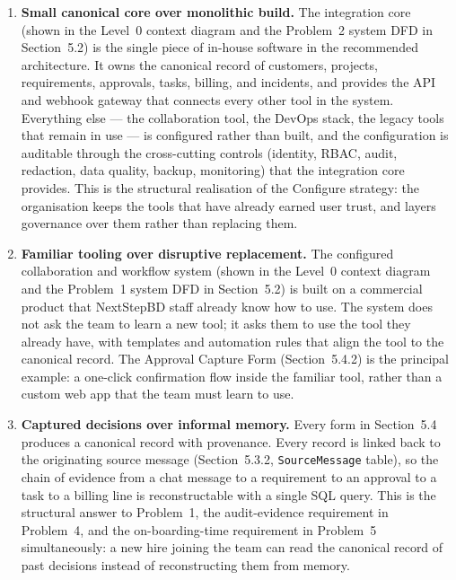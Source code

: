 \documentclass[12pt,a4paper]{report}
\begin{document}
\begin{enumerate}[leftmargin=1.6em]
    \item \textbf{Small canonical core over monolithic build.} The
          integration core (shown in the Level~0 context diagram and the
          Problem~2 system DFD in Section~5.2) is the single piece of
          in-house software in the recommended architecture. It owns the
          canonical record of customers, projects, requirements, approvals,
          tasks, billing, and incidents, and provides the API and webhook
          gateway that connects every other tool in the system. Everything
          else --- the collaboration tool, the DevOps stack, the legacy
          tools that remain in use --- is configured rather than built,
          and the configuration is auditable through the cross-cutting
          controls (identity, RBAC, audit, redaction, data quality,
          backup, monitoring) that the integration core provides. This is
          the structural realisation of the Configure strategy: the
          organisation keeps the tools that have already earned user
          trust, and layers governance over them rather than replacing
          them.
    \item \textbf{Familiar tooling over disruptive replacement.} The
          configured collaboration and workflow system (shown in the
          Level~0 context diagram and the Problem~1 system DFD in Section~5.2)
          is built on a commercial product that NextStepBD staff already
          know how to use. The system does not ask the team to learn a
          new tool; it asks them to use the tool they already have, with
          templates and automation rules that align the tool to the
          canonical record. The Approval Capture Form (Section~5.4.2) is
          the principal example: a one-click confirmation flow inside
          the familiar tool, rather than a custom web app that the team
          must learn to use.
    \item \textbf{Captured decisions over informal memory.} Every form
          in Section~5.4 produces a canonical record with provenance.
          Every record is linked back to the originating source message
          (Section~5.3.2, \texttt{SourceMessage} table), so the chain of
          evidence from a chat message to a requirement to an approval
          to a task to a billing line is reconstructable with a single
          SQL query. This is the structural answer to Problem~1, the
          audit-evidence requirement in Problem~4, and the
          on-boarding-time requirement in Problem~5 simultaneously: a
          new hire joining the team can read the canonical record of
          past decisions instead of reconstructing them from memory.
\end{enumerate}
\end{document}
